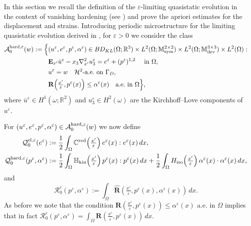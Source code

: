 \documentclass[reqno,10pt]{amsart}
\numberwithin{equation}{section}
\theoremstyle{remark}
\newcommand{\calA}{\mathcal{A}}
\newcommand{\C}{\mathbb{C}}
\newcommand{\calH}{\mathcal{H}}
\newcommand{\M}{\mathbb{M}}
\newcommand{\calQ}{\mathcal{Q}}
\newcommand{\R}{\mathbb{R}}
\newcommand{\calR}{\mathcal{R}}
\DeclareMathOperator{\dev}{dev}
\DeclareMathOperator{\sym}{sym}
\newcommand{\Dir}{D}
\newcommand{\eps}{\varepsilon}
\newcommand{\E}{{\bf E}}
\newcommand{\D}{\nabla}
\newcommand{\Hkin}{\mathbb{H}_{\rm kin}}
\newcommand{\Hiso}{H_{\rm iso}}
\newcommand{\disspot}{\mathbf{R}}
\newcommand{\gendisspot}{\widehat{\disspot}}
\newcommand{\red}[1]{#1^{\rm red}}
\begin{document}
In this section we recall the definition of the $\eps$-limiting quasistatic evolution in the context of vanishing hardening (see ) and prove the apriori estimates for the displacement and strains. 
Introducing periodic microstructure for the limiting quasistatic evolution derived in , for $\eps > 0$ we consider the class
\begin{align*}
	\calA_{0}^{\rm hard,\eps}(w) := \Big\{ 
	& (u^\eps, e^\eps, p^\eps, \alpha^\eps) \in BD_{KL}(\Omega;\R^3) \times L^2(\Omega;\M^{2 \times 2}_{\sym}) \times L^2(\Omega;\M^{3 \times 3}_{\dev}) \times L^2(\Omega) :
	\\& {\E}_{x'}\bar{u}^\eps - x_3 {\D}^2_{x'}u_3^\eps = e^\eps + (p^\eps)^{1,2} \quad \text{ in } \Omega,
	\\& u^\eps = w \quad \calH^{2}\text{-a.e.}\text{ on } \Gamma_\Dir,
	\\& \disspot\!\left(\tfrac{x'}{\eps}, p^\eps(x)\right) \leq \alpha^\eps(x) \quad \text{a.e.} \text{ in } \Omega 
	\Big\},
\end{align*}
where $\bar{u}^\eps \in H^1(\omega;\R^2)$ and $u_3^\eps \in H^2(\omega)$ are the Kirchhoff--Love components of $u^\eps$.

For $(u^\eps, e^\eps, p^\eps, \alpha^\eps) \in \calA_{0}^{\rm hard,\eps}(w)$ we now define
\begin{align}
	\calQ^{\rm el,\eps}_{0}(e^\eps) & := \frac{1}{2} \int_{\Omega} \red{\C}\!\left(\tfrac{x'}{\eps}\right) e^\eps(x) : e^\eps(x) \,dx, \label{definition Q^el,eps_0}\\
	\calQ^{\rm hard,\eps}_{0}(p^\eps, \alpha^\eps) & := \frac{1}{2} \int_{\Omega} \Hkin\!\left(\tfrac{x'}{\eps}\right) p^\eps(x) : p^\eps(x) \,dx + \frac{1}{2} \int_{\Omega} \Hiso\!\left(\tfrac{x'}{\eps}\right) \alpha^\eps(x) \cdot \alpha^\eps(x) \,dx, \label{definition Q^hard,eps_0}
\end{align}
and
\begin{equation} \label{definition R^eps_0}
	\calR^{\eps}_{0}(p^\eps, \alpha^\eps) := \int_{\Omega} \gendisspot\!\left(\tfrac{x'}{\eps}, p^\eps(x), \alpha^\eps(x)\right) \,dx.
\end{equation}
As before we note that the condition $\disspot\!\left(\tfrac{x'}{\eps}, p^\eps(x)\right) \leq \alpha^\eps(x)$ a.e. in $\Omega$ implies that in fact $\calR^{\eps}_{0}(p^\eps, \alpha^\eps) = \int_{\Omega} \disspot\!\left(\tfrac{x'}{\eps}, p^\eps(x)\right) \,dx$.
\end{document}
